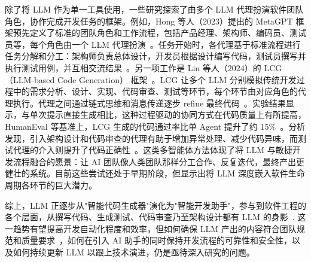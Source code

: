 除了将 LLM 作为单一工具使用，一些研究探索了由多个 LLM 代理扮演软件团队角色，协作完成开发任务的框架。例如，Hong 等人（2023）提出的 MetaGPT 框架预先定义了标准的团队角色和工作流程，包括产品经理、架构师、编码员、测试员等，每个角色由一个 LLM 代理扮演~\cite{MetaGPT2023}。任务开始时，各代理基于标准流程进行任务分解和分工：架构师负责总体设计，开发员根据设计编写代码，测试员撰写并执行测试用例，并互相交流结果~\cite{MetaGPT2023}。另一项工作是 Lin 等人（2024）的 LCG（LLM-based Code Generation） 框架~\cite{LCG2024}。LCG 让多个 LLM 分别模拟传统开发过程中的需求分析、设计、实现、代码审查、测试等环节，每个环节由对应角色的代理执行。代理之间通过链式思维和消息传递逐步 refine 最终代码~\cite{LCG2024}。实验结果显示，与单次提示直接生成相比，这种过程驱动的协同方式在代码质量上有所提高，HumanEval 等基准上，LCG 生成的代码通过率比单 Agent 提升了约 15\%~\cite{LCG2024}。分析发现，引入架构设计和代码审查的代理有助于增加异常处理、减少代码异味，而测试代理的介入则提升了代码正确性~\cite{LCG2024}。这类多智能体方法体现了将 LLM 与敏捷开发流程融合的愿景：让 AI 团队像人类团队那样分工合作、反复迭代，最终产出更健壮的系统。目前这些尝试还处于早期阶段，但显示出将 LLM 深度嵌入软件生命周期各环节的巨大潜力。

综上，LLM 正逐步从"智能代码生成器"演化为"智能开发助手"，参与到软件工程的各个层面，从撰写代码、生成测试、代码审查乃至架构设计都有 LLM 的身影~\cite{LCG2024}. 这一趋势有望提高开发自动化程度和效率，但如何确保 LLM 产出的内容符合团队规范和质量要求~\cite{ChatGPTUsage2023}，如何在引入 AI 助手的同时保持开发流程的可靠性和安全性，以及如何持续更新 LLM 以跟上技术演进，仍是亟待深入研究的问题。
